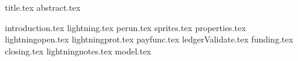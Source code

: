 \documentclass[11pt]{llncs}
\begin{document}
{title.tex}
\thispagestyle{plain}
{abstract.tex}

{introduction.tex}
{lightning.tex}
{perun.tex}
{sprites.tex}
{properties.tex}
{lightningopen.tex}
{lightningprot.tex}
{payfunc.tex}
{ledgerValidate.tex}
{funding.tex}
{closing.tex}
{lightningnotes.tex}
{model.tex}

\end{document}
